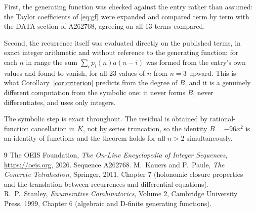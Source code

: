 \documentclass[11pt,a4paper]{article}
\theoremstyle{plain}
\theoremstyle{definition}
\begin{document}
First, the generating function was checked against the entry rather than assumed: the
Taylor coefficients of \eqref{eq:gf} were expanded and compared term by term with the DATA
section of A262768, agreeing on all 13 terms compared.

Second, the recurrence itself was evaluated directly on the published terms, in exact
integer arithmetic and without reference to the generating function: for each $n$ in range
the sum $\sum_{i}p_{i}(n)a(n-i)$ was formed from the entry's own values and found to
vanish, for all 23 values of $n$ from $n=3$ upward. This is what
Corollary~\ref{cor:criterion} predicts from the degree of $B$, and it is a genuinely
different computation from the symbolic one: it never forms $B$, never differentiates, and
uses only integers.

The symbolic step is exact throughout. The residual is obtained by rational-function
cancellation in $K$, not by series truncation, so the identity $B=- 96 x^{2}$ is an
identity of functions and the theorem holds for all $n>2$ simultaneously.

\begin{thebibliography}{9}
 The OEIS Foundation, \emph{The On-Line Encyclopedia of Integer Sequences},
\url{https://oeis.org}, 2026. Sequence A262768.
 M.~Kauers and P.~Paule, \emph{The Concrete Tetrahedron}, Springer, 2011,
Chapter 7 (holonomic closure properties and the translation between recurrences and
differential equations).
 R.~P.~Stanley, \emph{Enumerative Combinatorics}, Volume 2, Cambridge
University Press, 1999, Chapter 6 (algebraic and D-finite generating functions).
\end{thebibliography}
\end{document}
